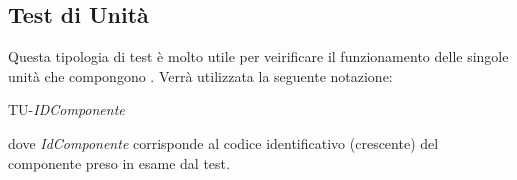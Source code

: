 \newpage
\subsection{Test di Unità}
Questa tipologia di test è molto utile per veirificare il funzionamento delle singole unità che compongono .
Verrà utilizzata la seguente notazione:
	\begin{center}
		TU-\textit{IDComponente}
	\end{center}
dove \textit{IdComponente} corrisponde al codice identificativo (crescente) del componente preso in esame dal test.




 

